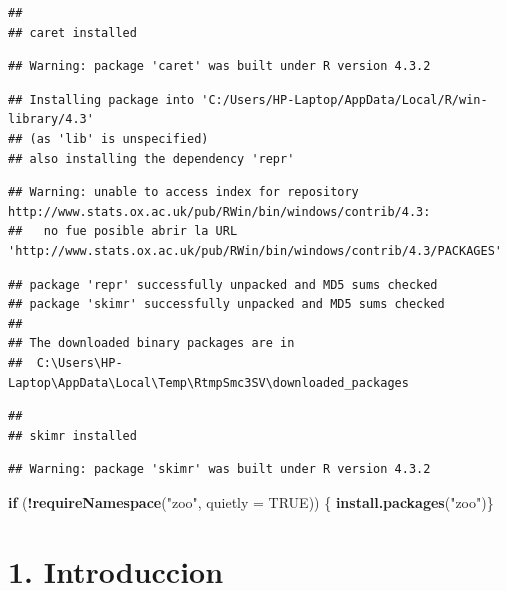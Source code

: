 \documentclass[
]{article}
\newenvironment{Shaded}{\begin{snugshade}}{\end{snugshade}}
\newcommand{\AttributeTok}[1]{\textcolor[rgb]{0.13,0.29,0.53}{#1}}
\newcommand{\ConstantTok}[1]{\textcolor[rgb]{0.56,0.35,0.01}{#1}}
\newcommand{\ControlFlowTok}[1]{\textcolor[rgb]{0.13,0.29,0.53}{\textbf{#1}}}
\newcommand{\FunctionTok}[1]{\textcolor[rgb]{0.13,0.29,0.53}{\textbf{#1}}}
\newcommand{\NormalTok}[1]{#1}
\newcommand{\SpecialCharTok}[1]{\textcolor[rgb]{0.81,0.36,0.00}{\textbf{#1}}}
\newcommand{\StringTok}[1]{\textcolor[rgb]{0.31,0.60,0.02}{#1}}
\begin{document}
\begin{verbatim}
## 
## caret installed
\end{verbatim}

\begin{verbatim}
## Warning: package 'caret' was built under R version 4.3.2
\end{verbatim}

\begin{verbatim}
## Installing package into 'C:/Users/HP-Laptop/AppData/Local/R/win-library/4.3'
## (as 'lib' is unspecified)
## also installing the dependency 'repr'
\end{verbatim}

\begin{verbatim}
## Warning: unable to access index for repository http://www.stats.ox.ac.uk/pub/RWin/bin/windows/contrib/4.3:
##   no fue posible abrir la URL 'http://www.stats.ox.ac.uk/pub/RWin/bin/windows/contrib/4.3/PACKAGES'
\end{verbatim}

\begin{verbatim}
## package 'repr' successfully unpacked and MD5 sums checked
## package 'skimr' successfully unpacked and MD5 sums checked
## 
## The downloaded binary packages are in
##  C:\Users\HP-Laptop\AppData\Local\Temp\RtmpSmc3SV\downloaded_packages
\end{verbatim}

\begin{verbatim}
## 
## skimr installed
\end{verbatim}

\begin{verbatim}
## Warning: package 'skimr' was built under R version 4.3.2
\end{verbatim}

\begin{Shaded}
\begin{Highlighting}[]
\ControlFlowTok{if}\NormalTok{ (}\SpecialCharTok{!}\FunctionTok{requireNamespace}\NormalTok{(}\StringTok{"zoo"}\NormalTok{, }\AttributeTok{quietly =} \ConstantTok{TRUE}\NormalTok{)) \{}
  \FunctionTok{install.packages}\NormalTok{(}\StringTok{"zoo"}\NormalTok{)\}}
\end{Highlighting}
\end{Shaded}

\hypertarget{introduccion}{%
\section{1. Introduccion}\label{introduccion}}
\end{document}
